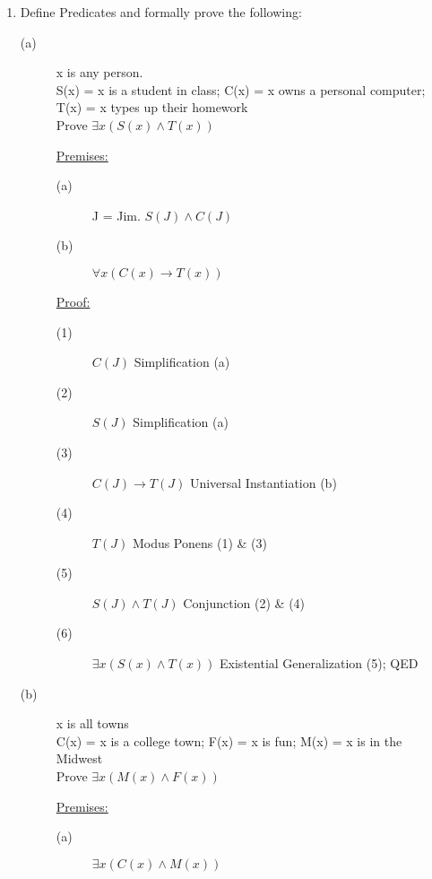 \documentclass[12pt]{article}
\begin{document}
\begin{enumerate}
\begin{description}
            \end{description}
        \newpage
        \item Define Predicates and formally prove the following:
            \begin{description}
                \item[(a)] \begin{center}x is any person.\\S(x) = x is a student in class; C(x) = x owns a personal computer; T(x) = x types up their homework\\ Prove $\exists x(S(x) \land T(x))$ \end{center}
                    \underline{Premises:}
                    \begin{description}
                        \item[(a)] J = Jim. $S(J) \land C(J)$
                        \item[(b)] $\forall x(C(x) \to T(x))$
                    \end{description}
                    \underline{Proof:}
                    \begin{description}
                        \item[(1)] $C(J)$ \null\hfill Simplification (a)
                        \item[(2)] $S(J)$ \null\hfill Simplification (a)
                        \item[(3)] $C(J) \to T(J)$ \null\hfill Universal Instantiation (b)
                        \item[(4)] $T(J)$ \null\hfill Modus Ponens (1) \& (3)
                        \item[(5)] $S(J) \land T(J)$ \null\hfill Conjunction (2) \& (4)
                        \item[(6)] $\exists x(S(x) \land T(x))$ \null\hfill Existential Generalization (5); QED
                    \end{description}
                \item[(b)] \begin{center}x is all towns\\C(x) = x is a college town; F(x) = x is fun; M(x) = x is in the Midwest\\ Prove $\exists x(M(x) \land F(x))$ \end{center}
                    \underline{Premises:}
                    \begin{description}
                        \item[(a)] $\exists x(C(x) \land M(x))$

\end{description}
\end{description}
\end{enumerate}
\end{document}
